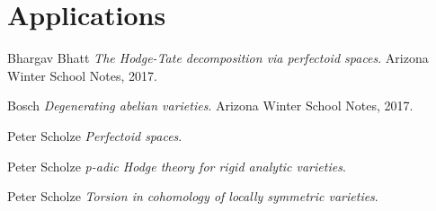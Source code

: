 \documentclass[11pt,oneside]{amsart}
\theoremstyle{theorem}
\theoremstyle{definition}
\theoremstyle{remark}
\begin{document}
\section{Applications}





















































































\newpage



\begin{thebibliography}{9}

Bhargav Bhatt
\textit{The Hodge-Tate decomposition via perfectoid spaces}. 
Arizona Winter School Notes, 2017.

Bosch
\textit{Degenerating abelian varieties}. 
Arizona Winter School Notes, 2017.

Peter Scholze
\textit{Perfectoid spaces}. 


Peter Scholze
\textit{p-adic Hodge theory for rigid analytic varieties}. 

Peter Scholze
\textit{Torsion in cohomology of locally symmetric varieties}.




\end{thebibliography}


 
\end{document}
